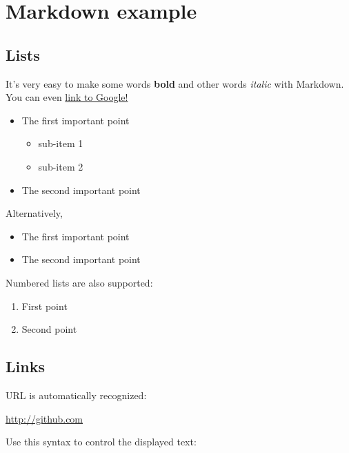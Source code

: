 \hypertarget{markdown-example}{%
\section{Markdown example}\label{markdown-example}}

\hypertarget{lists}{%
\subsection{Lists}\label{lists}}

It's very easy to make some words \textbf{bold} and other words
\emph{italic} with Markdown. You can even \href{http://google.com}{link
to Google!}

\begin{itemize}
\tightlist
\item
  The first important point

  \begin{itemize}
  \tightlist
  \item
    sub-item 1
  \item
    sub-item 2
  \end{itemize}
\item
  The second important point
\end{itemize}

Alternatively,

\begin{itemize}
\tightlist
\item
  The first important point
\item
  The second important point
\end{itemize}

Numbered lists are also supported:

\begin{enumerate}
\def\labelenumi{\arabic{enumi}.}
\tightlist
\item
  First point
\item
  Second point
\end{enumerate}

\hypertarget{links}{%
\subsection{Links}\label{links}}

URL is automatically recognized:

\href{http://github.com}{http://github.com}

Use this syntax to control the displayed text:

